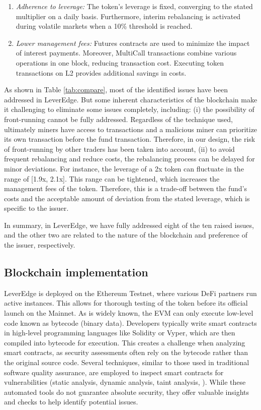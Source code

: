 \begin{enumerate}[label={\ref{sec:proposal}.\arabic*},leftmargin=*]
	\item \textit{Adherence to leverage:} The token's leverage is fixed, converging to the stated multiplier on a daily basis. Furthermore, interim rebalancing is activated during volatile markets when a 10\% threshold is reached.
	
	\item \textit{Lower management fees:} Futures contracts are used to minimize the impact of interest payments. Moreover, MultiCall transactions combine various operations in one block, reducing transaction cost. Executing token transactions on L2 provides additional savings in costs.
\end{enumerate}

As shown in Table \ref{tab:compare}, most of the identified issues have been addressed in LeverEdge. But some inherent characteristics of the blockchain make it challenging to eliminate some issues completely, including: (i) the possibility of front-running cannot be fully addressed. Regardless of the technique used, ultimately miners have access to transactions and a malicious miner can prioritize its own transaction before the fund transaction. Therefore, in our design, the risk of front-running by other traders has been taken into account, (ii) to avoid frequent rebalancing and reduce costs, the rebalancing process can be delayed for minor deviations. For instance, the leverage of a 2x token can fluctuate in the range of [1.9x, 2.1x]. This range can be tightened, which increases the management fees of the token. Therefore, this is a trade-off between the fund's costs and the acceptable amount of deviation from the stated leverage, which is specific to the issuer.
	
In summary, in LeverEdge, we have fully addressed eight of the ten raised issues, and the other two are related to the nature of the blockchain and preference of the issuer, respectively.



\subsection{Blockchain implementation}
LeverEdge is deployed on the Ethereum Testnet, where various DeFi partners run active instances. This allows for thorough testing of the token before its official launch on the Mainnet. As is widely known, the EVM can only execute low-level code known as bytecode (binary data). Developers typically write smart contracts in high-level programming languages like Solidity or Vyper, which are then compiled into bytecode for execution. This creates a challenge when analyzing smart contracts, as security assessments often rely on the bytecode rather than the original source code. Several techniques, similar to those used in traditional software quality assurance, are employed to inspect smart contracts for vulnerabilities (\eg static analysis, dynamic analysis, taint analysis, \etc). While these automated tools do not guarantee absolute security, they offer valuable insights and checks to help identify potential issues.

